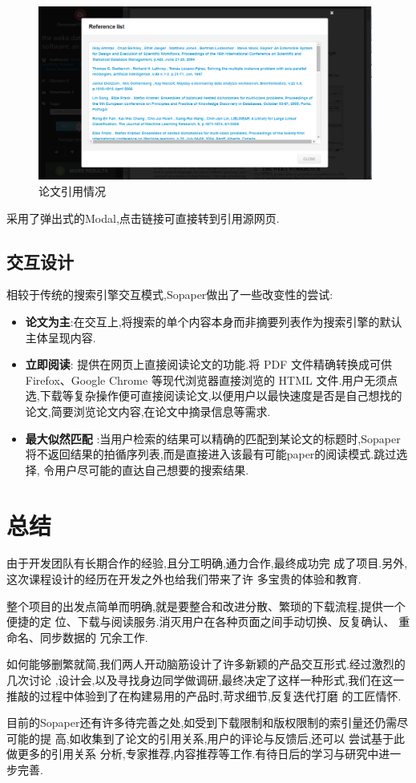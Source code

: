 \begin{figure}[H]
  \small
  \centering
  \includegraphics[width=11cm]{img/reference.png}
  \caption{论文引用情况}
\end{figure}

采用了弹出式的Modal,点击链接可直接转到引用源网页.

\subsection{交互设计}

相较于传统的搜索引擎交互模式,Sopaper做出了一些改变性的尝试:
\begin{itemize}
  \item \textbf{论文为主}:在交互上,将搜索的单个内容本身而非摘要列表作为搜索引擎的默认主体呈现内容.
  \item \textbf{立即阅读}: 提供在网页上直接阅读论文的功能.将 PDF 文件精确转换成可供 Firefox、Google Chrome 等现代浏览器直接浏览的 HTML 文件.用户无须点选,下载等复杂操作便可直接阅读论文,以便用户以最快速度是否是自己想找的论文,简要浏览论文内容,在论文中摘录信息等需求.
  \item \textbf{最大似然匹配} :当用户检索的结果可以精确的匹配到某论文的标题时,Sopaper将不返回结果的拍循序列表,而是直接进入该最有可能paper的阅读模式.跳过选择, 令用户尽可能的直达自己想要的搜索结果.
\end{itemize}


\section{总结}
由于开发团队有长期合作的经验,且分工明确,通力合作,最终成功完
成了项目.另外,这次课程设计的经历在开发之外也给我们带来了许 多宝贵的体验和教育.

整个项目的出发点简单而明确,就是要整合和改进分散、繁琐的下载流程,提供一个便捷的定
位、下载与阅读服务.消灭用户在各种页面之间手动切换、反复确认、 重命名、同步数据的
冗余工作.

如何能够删繁就简,我们两人开动脑筋设计了许多新颖的产品交互形式.经过激烈的几次讨论
,设计会,以及寻找身边同学做调研,最终决定了这样一种形式,我们在这一推敲的过程中体验到了在构建易用的产品时,苛求细节,反复迭代打磨
的工匠情怀.

目前的Sopaper还有许多待完善之处,如受到下载限制和版权限制的索引量还仍需尽可能的提
高,如收集到了论文的引用关系,用户的评论与反馈后,还可以 尝试基于此做更多的引用关系
分析,专家推荐,内容推荐等工作.有待日后的学习与研究中进一步完善.
